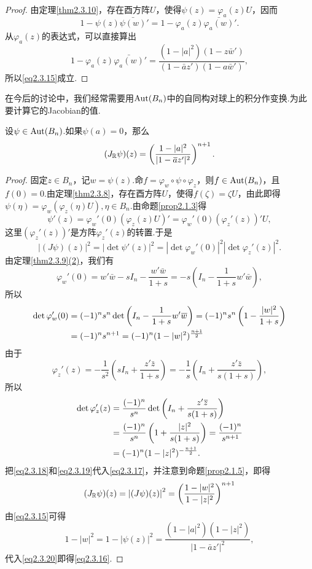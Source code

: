 \begin{proof}
	由定理\ref{thm2.3.10}，存在酉方阵$U$，使得$\psi(z)=\varphi_a(z)U$，因而
	\[1-\psi(z)\bar{\psi(w)}'=1-\varphi_a(z)\bar{\varphi_a(w)}'.\]
	从$\varphi_a(z)$的表达式，可以直接算出
	\[1-\varphi_a(z)\bar{\varphi_a(w)}'=\frac{(1-|a|^2)(1-z\bar{w}')}{(1-\bar{a}z')(1-a\bar{w}')},\]
	所以\eqref{eq2.3.15}成立.
\end{proof}
在今后的讨论中，我们经常需要用$\Aut(B_n)$中的自同构对球上的积分作变换.为此要计算它的Jacobian的值.
\begin{theorem}\label{thm2.3.12}
	设$\psi\in\Aut(B_n)$.如果$\psi(a)=0$，那么
	\begin{equation}\label{eq2.3.16}
		(J_\MR \psi)(z)=\left(\frac{1-|a|^2}{|1-\bar{a}z'|^2}\right)^{n+1} .
	\end{equation}
\end{theorem}
\begin{proof}
	固定$z\in B_n$，记$w=\psi(z)$.命$f=\varphi_w\circ\psi\circ\varphi_z$，则$f\in\Aut(B_n)$，且$f(0)=0$.由定理\ref{thm2.3.8}，存在酉方阵$U$，使得$f(\zeta)=\zeta U$，由此即得$\psi(\eta)=\varphi_w(\varphi_z(\eta)U),\eta\in B_n$.由命题\ref{prop2.1.3}得
	\[\psi'(z)=\varphi_w'(0)(\varphi_z(z)U)'=\varphi_w'(0)(\varphi_z'(z))' U,\]
	这里$(\varphi_z'(z))'$是方阵$\varphi_z'(z)$的转置.于是
	\begin{equation}\label{eq2.3.17}
		\left|(J\psi)(z)\right|^2=|\det\psi'(z)|^2=|\det \varphi_w'(0)|^2|\det\varphi_z'(z)|^2.
	\end{equation}
由定理\ref{thm2.3.9}\hyperlink{2.3.9}{(2)}，我们有
\[\varphi_w'(0)=w'\bar{w}-sI_n-\frac{w'\bar{w}}{1+s}=-s\left(I_n-\frac1{1+s}w'\bar{w}\right),\]
所以
\begin{align}\label{eq2.3.18}
	\det\varphi_w'(0)
	&=(-1)^n s^n\det\left(I_n-\frac1{1+s}w'\bar{w}\right)=(-1)^n s^n\left(1-\frac{|w|^2}{1+s}\right)\notag\\
	&=(-1)^n s^{n+1}=(-1)^n(1-|w|^2)^{\frac{n+1}{2}}
\end{align}
由于
\[\varphi_z'(z)=-\frac1{s^2}\left(sI_n+\frac{z'\bar{z}}{1+s}\right)=-\frac1s \left(I_n+\frac{z'\bar{z}}{s(1+s)}\right),\]
所以
\begin{align}\label{eq2.3.19}
	\det\varphi_z'(z)
	&=\frac{(-1)^n}{s^n} \det\left(I_n+\frac{z'\bar{z}}{s(1+s)}\right)\notag\\
	&=\frac{(-1)^n}{s^n}\left(1+\frac{|z|^2}{s(1+s)}\right)=\frac{(-1)^n}{s^{n+1}}\notag\\
	&=(-1)^n (1-|z|^2)^{-\frac{n+1}{2}}.
\end{align}
把\eqref{eq2.3.18}和\eqref{eq2.3.19}代入\eqref{eq2.3.17}，并注意到命题\ref{prop2.1.5}，即得
\begin{equation}\label{eq2.3.20}
	(J_\MR \psi)(z)=\left|(J\psi)(z)\right|^2=\left(\frac{1-|w|^2}{1-|z|^2}\right)^{n+1}
\end{equation}
由\eqref{eq2.3.15}可得
\[1-|w|^2=1-|\psi(z)|^2=\frac{(1-|a|^2)(1-|z|^2)}{|1-\bar{a}z'|^2},\]
代入\eqref{eq2.3.20}即得\eqref{eq2.3.16}.
\end{proof}

